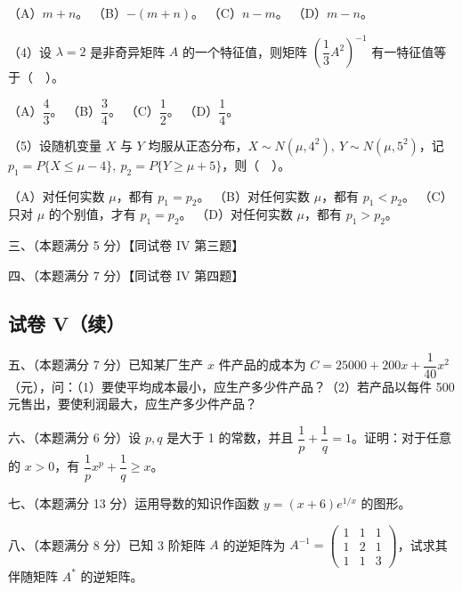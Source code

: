 \documentclass[UTF8,12pt]{ctexart}
\begin{document}
（A）\(\displaystyle m+n\)。 （B）\(\displaystyle -(m+n)\)。 （C）\(\displaystyle n-m\)。 （D）\(\displaystyle m-n\)。


（4）设 \(\displaystyle \lambda=2\) 是非奇异矩阵 \(\displaystyle A\) 的一个特征值，则矩阵 \(\displaystyle \left(\dfrac{\displaystyle 1}{\displaystyle 3} A^2\right)^{-1}\) 有一特征值等于（　）。


（A）\(\displaystyle \dfrac{\displaystyle 4}{\displaystyle 3}\)。 （B）\(\displaystyle \dfrac{\displaystyle 3}{\displaystyle 4}\)。 （C）\(\displaystyle \dfrac{\displaystyle 1}{\displaystyle 2}\)。 （D）\(\displaystyle \dfrac{\displaystyle 1}{\displaystyle 4}\)。


（5）设随机变量 \(\displaystyle X\) 与 \(\displaystyle Y\) 均服从正态分布，\(\displaystyle X\sim N(\mu,\allowbreak 4^2),\allowbreak \ Y\sim N(\mu,\allowbreak 5^2)\)，记 \(\displaystyle p_1=P\{X\leq\mu-4\},\allowbreak \ p_2=P\{Y\geq\mu+5\}\)，则（　）。


（A）对任何实数 \(\displaystyle \mu\)，都有 \(\displaystyle p_1=p_2\)。 （B）对任何实数 \(\displaystyle \mu\)，都有 \(\displaystyle p_1<p_2\)。 （C）只对 \(\displaystyle \mu\) 的个别值，才有 \(\displaystyle p_1=p_2\)。 （D）对任何实数 \(\displaystyle \mu\)，都有 \(\displaystyle p_1>p_2\)。


三、（本题满分 5 分）【同试卷 IV 第三题】


四、（本题满分 7 分）【同试卷 IV 第四题】


\subsection*{试卷 V（续）}

五、（本题满分 7 分）已知某厂生产 \(\displaystyle x\) 件产品的成本为 \(\displaystyle C=25000+200x+\dfrac{\displaystyle 1}{\displaystyle 40}x^2\)（元），问：（1）要使平均成本最小，应生产多少件产品？（2）若产品以每件 500 元售出，要使利润最大，应生产多少件产品？


六、（本题满分 6 分）设 \(\displaystyle p,\allowbreak q\) 是大于 1 的常数，并且 \(\displaystyle \dfrac{\displaystyle 1}{\displaystyle p}+\dfrac{\displaystyle 1}{\displaystyle q}=1\)。证明：对于任意的 \(\displaystyle x>0\)，有 \(\displaystyle \dfrac{\displaystyle 1}{\displaystyle p} x^p+\dfrac{\displaystyle 1}{\displaystyle q}\geq x\)。


七、（本题满分 13 分）运用导数的知识作函数 \(\displaystyle y=(x+6)e^{1/x}\) 的图形。


八、（本题满分 8 分）已知 3 阶矩阵 \(\displaystyle A\) 的逆矩阵为 \(\displaystyle A^{-1}=\begin{pmatrix}1&1&1\\1&2&1\\1&1&3\end{pmatrix}\)，试求其伴随矩阵 \(\displaystyle A^*\) 的逆矩阵。
\end{document}
